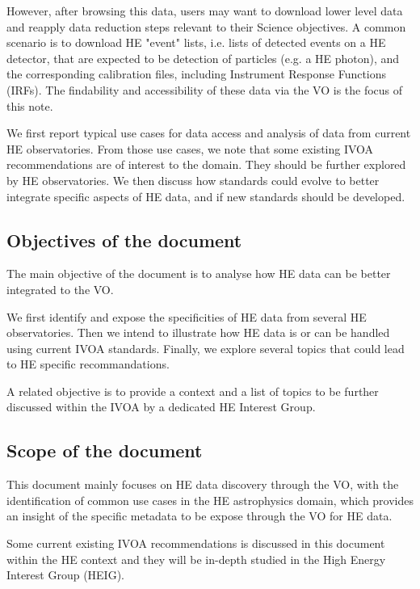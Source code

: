 \documentclass[11pt,a4paper]{ivoa}
\begin{document}
However, after browsing this data, users may want to download lower level data and reapply data reduction steps relevant to their Science objectives. A common scenario is to download HE "event" lists, i.e. lists of detected events on a HE detector, that are expected to be detection of particles (e.g. a HE photon), and the corresponding calibration files, including Instrument Response Functions (IRFs). The findability and accessibility of these data via the VO is the focus of this note.

We first report typical use cases for data access and analysis of data from current HE observatories. From those use
cases, we note that some existing IVOA recommendations are of interest to the domain. They should be further explored
by HE observatories. We then discuss how standards could evolve to better integrate specific aspects of HE data, and if
new standards should be developed.

\subsection{Objectives of the document}

The main objective of the document is to analyse how HE data can be better integrated to the VO.

We  first identify and expose the specificities of HE data from several HE observatories. Then we intend to illustrate how HE data is or can be handled using current IVOA standards. Finally, we explore several topics that could lead to HE specific recommandations.

A related objective is to provide a context and a list of topics to be further discussed within the IVOA by a dedicated HE Interest Group.


\subsection{Scope of the document}

This document mainly focuses on HE data discovery through the VO, with the identification of common use cases in the HE astrophysics domain, which provides an insight of the specific metadata to be expose through the VO for HE data.

Some current existing IVOA recommendations is discussed in this document within the HE context and they will be in-depth
studied in the High Energy Interest Group (HEIG).



\end{document}
